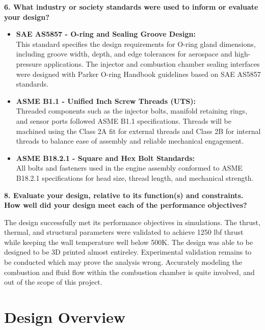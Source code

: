 \textbf{6. What industry or society standards were used to inform or evaluate your design?}
\begin{itemize}
    \item \textbf{SAE AS5857 - O-ring and Sealing Groove Design:} \\
    This standard specifies the design requirements for O-ring gland dimensions, including groove width, depth, and edge tolerances for aerospace and high-pressure applications. The injector and combustion chamber sealing interfaces were designed with Parker O-ring Handbook guidelines based on SAE AS5857 standards.
    
    \item \textbf{ASME B1.1 - Unified Inch Screw Threads (UTS):} \\
    Threaded components such as the injector bolts, manifold retaining rings, and sensor ports followed ASME B1.1 specifications. Threads will be machined using the Class 2A fit for external threads and Class 2B for internal threads to balance ease of assembly and reliable mechanical engagement. 
    

    \item \textbf{ASME B18.2.1 - Square and Hex Bolt Standards:} \\
    All bolts and fasteners used in the engine assembly conformed to ASME B18.2.1 specifications for head size, thread length, and mechanical strength. 



\end{itemize}


\textbf{8. Evaluate your design, relative to its function(s) and constraints. How well did your design meet each of the performance objectives?}

The design successfully met its performance objectives in simulations. The thrust, thermal, and structural parameters were validated to achieve 1250 lbf thrust while keeping the wall temperature well below 500K. The design was able to be designed to be 3D printed almost entireley. Experimental validation remains to be conducted which may prove the analysis wrong. Accurately modeling the combustion and fluid flow within the combustion chamber is quite involved, and out of the scope of this project. 




\section{Design Overview}

